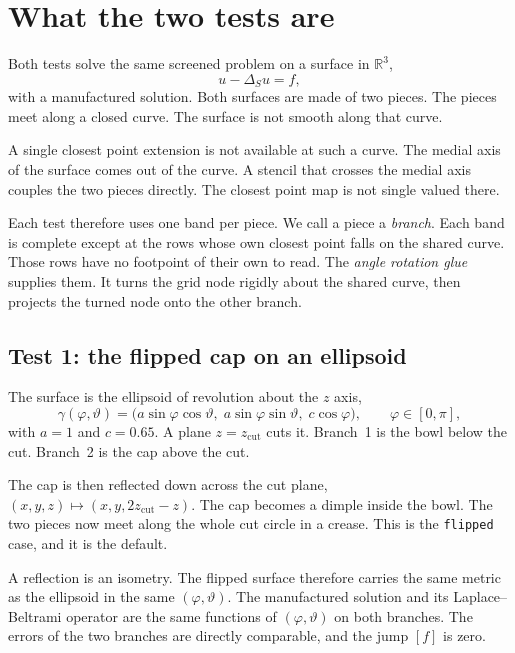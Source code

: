 
\section{What the two tests are}

Both tests solve the same screened problem on a surface in $\mathbb{R}^3$,
\begin{equation}
  u - \Delta_S u = f ,
  \label{eq:pde}
\end{equation}
with a manufactured solution. Both surfaces are made of two pieces. The
pieces meet along a closed curve. The surface is not smooth along that
curve.

A single closest point extension is not available at such a curve. The
medial axis of the surface comes out of the curve. A stencil that crosses
the medial axis couples the two pieces directly. The closest point map is
not single valued there.

Each test therefore uses one band per piece. We call a piece a
\emph{branch}. Each band is complete except at the rows whose own closest
point falls on the shared curve. Those rows have no footpoint of their
own to read. The \emph{angle rotation glue} supplies them. It turns the
grid node rigidly about the shared curve, then projects the turned node
onto the other branch.

\subsection{Test 1: the flipped cap on an ellipsoid}

The surface is the ellipsoid of revolution about the $z$ axis,
\begin{equation}
  \gamma(\varphi,\vartheta) = \bigl(a\sin\varphi\cos\vartheta,\;
  a\sin\varphi\sin\vartheta,\; c\cos\varphi \bigr),
  \qquad \varphi\in[0,\pi],
\end{equation}
with $a=1$ and $c=0.65$. A plane $z=z_{\mathrm{cut}}$ cuts it. Branch~1
is the bowl below the cut. Branch~2 is the cap above the cut.

The cap is then reflected down across the cut plane,
$(x,y,z)\mapsto(x,y,2z_{\mathrm{cut}}-z)$. The cap becomes a dimple
inside the bowl. The two pieces now meet along the whole cut circle in a
crease. This is the \texttt{flipped} case, and it is the default.

A reflection is an isometry. The flipped surface therefore carries the
same metric as the ellipsoid in the same $(\varphi,\vartheta)$. The
manufactured solution and its Laplace--Beltrami operator are the same
functions of $(\varphi,\vartheta)$ on both branches. The errors of the
two branches are directly comparable, and the jump $[f]$ is zero.

